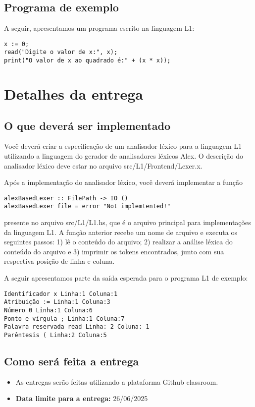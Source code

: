 \documentclass[a4paper,11pt]{article}
\begin{document}
\subsection*{Programa de exemplo}
\label{sec:org379ade7}

A seguir, apresentamos um programa escrito na linguagem L1:

\begin{verbatim}
x := 0;
read("Digite o valor de x:", x);
print("O valor de x ao quadrado é:" + (x * x));
\end{verbatim}
\section*{Detalhes da entrega}
\label{sec:orgbdbe1b2}

\subsection*{O que deverá ser implementado}
\label{sec:orga45591e}

Você deverá criar a especificação de um analisador léxico para a linguagem L1 utilizando a linguagem do gerador de
analisadores léxicos Alex. O descrição do analisador léxico deve estar no arquivo src/L1/Frontend/Lexer.x.

Após a implementação do analisador léxico, você deverá implementar a função

\begin{verbatim}
alexBasedLexer :: FilePath -> IO ()
alexBasedLexer file = error "Not implemtented!"
\end{verbatim}

presente no arquivo src/L1/L1.hs, que é o arquivo principal para implementações da linguagem L1. A função anterior
recebe um nome de arquivo e executa os seguintes passos: 1) lê o conteúdo do arquivo; 2) realizar a análise léxica
do conteúdo do arquivo e 3) imprimir os tokens encontrados, junto com sua respectiva posição de linha e coluna.

A seguir apresentamos parte da saída esperada para o programa L1 de exemplo:

\begin{verbatim}
Identificador x Linha:1 Coluna:1
Atribuição := Linha:1 Coluna:3
Número 0 Linha:1 Coluna:6
Ponto e vírgula ; Linha:1 Coluna:7
Palavra reservada read Linha: 2 Coluna: 1
Parêntesis ( Linha:2 Coluna:5
\end{verbatim}
\subsection*{Como será feita a entrega}
\label{sec:orgcd161f8}

\begin{itemize}
\item As entregas serão feitas utilizando a plataforma Github classroom.

\item \textbf{\textbf{Data limite para a entrega:}} 26/06/2025
\end{itemize}
\end{document}
